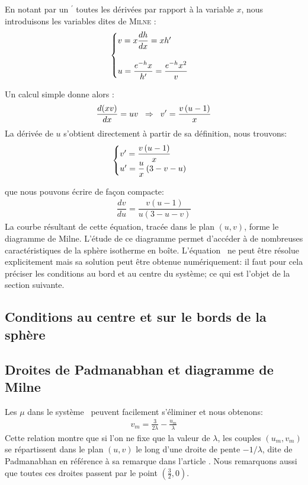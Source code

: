 		En notant par un $^\prime$ toutes les dérivées par rapport à la variable $x$, nous introduisons les variables dites de \textsc{Milne :}
		\begin{align}
			\begin{cases}
			v = x \dfrac{d h}{dx} = x h' \\
			\\
			u = \dfrac{e^{-h} x}{h'} = \dfrac{e^{-h} x^2}{v}
		\end{cases}\label{syst_uv}
		\end{align}
		
Un calcul simple donne alors :
\begin{align}
	\dfrac{d(xv)}{dx} = uv \;\;\Rightarrow\;\; v' = \frac{v \left( u - 1\right)}{x} \notag
\end{align}
La dérivée de $u$ s'obtient directement à partir de sa définition, nous trouvons:
	$$\begin{cases}
		v' = \dfrac{v \left( u - 1\right)}{x} \\
		u' = \dfrac{u}{x}\left(3 - v - u\right)
	\end{cases} \label{systdudv}$$
	
	que nous pouvons écrire de façon compacte:
	\begin{align}
		\dfrac{d v}{d u} = \dfrac{v \left( u - 1\right)}{u \left(3 - u - v\right)}
		\label{eqdudv}
	\end{align}
	La courbe résultant de cette équation, tracée dans le plan $\left(u, v\right)$, forme le diagramme
	de Milne. L'étude de ce diagramme permet d'accéder à de nombreuses caractéristiques de la sphère isotherme en
	boîte. L'équation~ ne peut être résolue explicitement mais sa solution peut être obtenue
	numériquement: il faut pour cela préciser les conditions au bord et au centre du système; ce qui est l'objet de la
	section suivante.
	

\subsection{Conditions au centre et sur le bords de la sphère}
	

\subsection{Droites de Padmanabhan et diagramme de Milne}
	Les $\mu$ dans le système~ peuvent facilement s'éliminer et nous obtenons:
	\begin{align}
		v_m = \frac{3}{2\lambda} - \frac{u_m}{\lambda}\label{droitePb}
	\end{align}
	Cette relation montre que si l'on ne fixe que la valeur de $\lambda$,  les couples $(u_m,v_m)$  se répartissent
	dans le plan $(u,v)$ le long d'une droite de pente $-1/\lambda$, dite de Padmanabhan en référence à sa remarque
	dans l'article \cite{1989ApJS...71..651P}. Nous remarquons aussi que toutes ces droites passent par le point
	$(\frac{3}{2},0)$.
	
